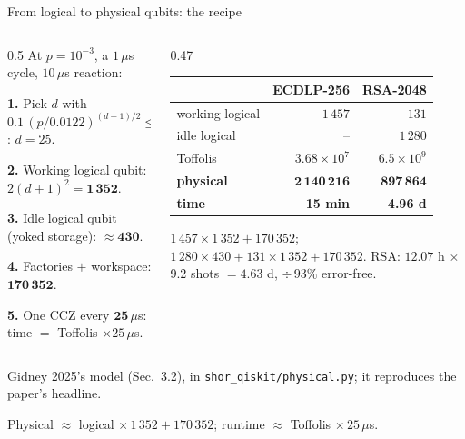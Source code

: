 \documentclass[aspectratio=169,11pt]{beamer}
\begin{document}
{
\begin{frame}[noframenumbering]{From logical to physical qubits: the recipe}
  \begin{columns}[T,onlytextwidth]
    \begin{column}{0.5\textwidth}
      \footnotesize
      At $p=10^{-3}$, a $1\,\mu$s cycle, $10\,\mu$s reaction:\par\vskip1mm
      \textbf{1.} Pick $d$ with $0.1\,(p/0.0122)^{(d+1)/2}\le10^{-15}$: $d=25$.\par\vskip0.6mm
      \textbf{2.} Working logical qubit: $2(d+1)^2=\mathbf{1\,352}$.\par\vskip0.6mm
      \textbf{3.} Idle logical qubit (yoked storage): ${\approx}\mathbf{430}$.\par\vskip0.6mm
      \textbf{4.} Factories $+$ workspace: $\mathbf{170\,352}$.\par\vskip0.6mm
      \textbf{5.} One CCZ every $\mathbf{25}\,\mu$s: time $=$ Toffolis $\times25\,\mu$s.
    \end{column}
    \begin{column}{0.47\textwidth}
      \centering\footnotesize
      \renewcommand{\arraystretch}{1.2}
      \begin{tabular}{@{}lrr@{}}
        \toprule
        & ECDLP-256 & RSA-2048 \\
        \midrule
        working logical & $1\,457$ & $131$ \\
        idle logical & -- & $1\,280$ \\
        Toffolis & $3.68\times10^{7}$ & $6.5\times10^{9}$ \\
        \textbf{physical} & $\mathbf{2\,140\,216}$ & $\mathbf{897\,864}$ \\
        \textbf{time} & \textbf{15 min} & \textbf{4.96 d} \\
        \bottomrule
      \end{tabular}\par
      \vskip1mm\raggedright
      {\scriptsize $1\,457\times1\,352+170\,352$; \ $1\,280\times430+131\times1\,352+170\,352$. RSA: $12.07$ h $\times$ 9.2 shots $=4.63$ d, $\div\,93\%$ error-free.}
    \end{column}
  \end{columns}
  \vskip1mm
  {\scriptsize\color{subtle}Gidney 2025's model (Sec.~3.2), in \texttt{shor\_qiskit/physical.py}; it reproduces the paper's headline.}
  \begin{takeaway}Physical $\approx$ logical $\times\,1\,352+170\,352$; runtime $\approx$ Toffolis $\times\,25\,\mu$s.\end{takeaway}
\end{frame}}
\end{document}
